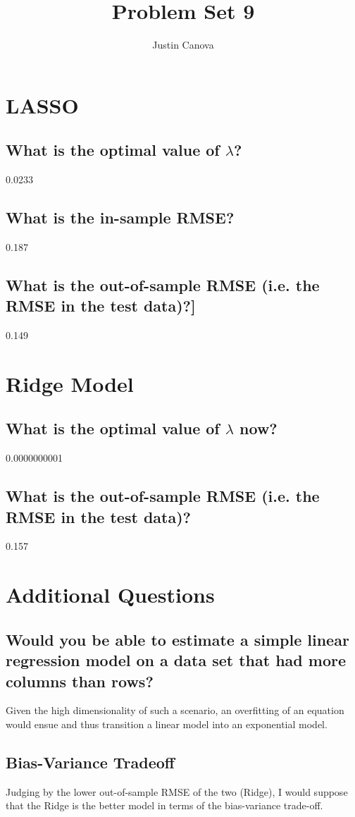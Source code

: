 \documentclass{article}
\title{Problem Set 9}
\author{Justin Canova}
\begin{document}
\maketitle

\section{LASSO}
\subsection{What is the optimal value of $\lambda$?}
0.0233

\subsection{What is the in-sample RMSE?}
0.187

\subsection{What is the out-of-sample RMSE (i.e. the RMSE in the test data)?]}
0.149


\section{Ridge Model}
\subsection{What is the optimal value of $\lambda$ now?}
0.0000000001

\subsection{What is the out-of-sample RMSE (i.e. the RMSE in the test data)?}
0.157

\section{Additional Questions}
\subsection{Would you be able to estimate a simple linear regression model on a data set that had more columns than rows?}

Given the high dimensionality of such a scenario, an overfitting of an equation would ensue and thus transition a linear model into an exponential model.


\subsection{Bias-Variance Tradeoff}
Judging by the lower out-of-sample RMSE of the two (Ridge), I would suppose that the Ridge is the better model in terms of the bias-variance trade-off.
\end{document}
